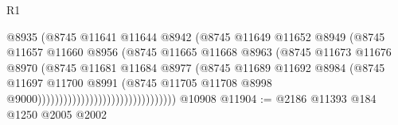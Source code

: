 \begin{lexlean}{R1}
\begin{coremodule}
                                                  @8935
                                                  (@8745
                                                    @11641
                                                    @11644
                                                    @8942
                                                    (@8745
                                                      @11649
                                                      @11652
                                                      @8949
                                                      (@8745
                                                        @11657
                                                        @11660
                                                        @8956
                                                        (@8745
                                                          @11665
                                                          @11668
                                                          @8963
                                                          (@8745
                                                            @11673
                                                            @11676
                                                            @8970
                                                            (@8745
                                                              @11681
                                                              @11684
                                                              @8977
                                                              (@8745
                                                                @11689
                                                                @11692
                                                                @8984
                                                                (@8745
                                                                  @11697
                                                                  @11700
                                                                  @8991
                                                                  (@8745
                                                                    @11705
                                                                    @11708
                                                                    @8998
                                                                    @9000))))))))))))))))))))))))))))))))
    @10908
@11904 := @2186 @11393 @184 @1250 @2005 @2002

\end{coremodule}
\end{lexlean}
